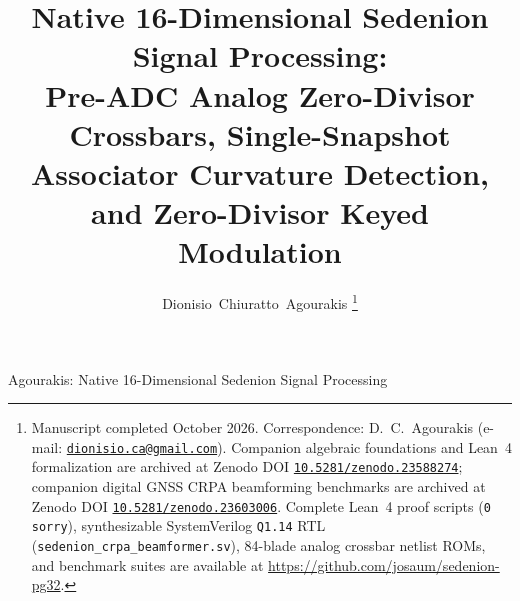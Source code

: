 \documentclass[journal,twoside]{IEEEtran}
\theoremstyle{definition}
\theoremstyle{remark}
\begin{document}
\title{Native 16-Dimensional Sedenion Signal Processing:\\
Pre-ADC Analog Zero-Divisor Crossbars, Single-Snapshot Associator Curvature Detection, and Zero-Divisor Keyed Modulation}

\author{Dionisio~Chiuratto~Agourakis%
\thanks{Manuscript completed October 2026. Correspondence: D.~C.~Agourakis (e-mail: \href{mailto:dionisio.ca@gmail.com}{\texttt{dionisio.ca@gmail.com}}). Companion algebraic foundations and Lean~4 formalization are archived at Zenodo DOI \href{https://doi.org/10.5281/zenodo.23588274}{\texttt{10.5281/zenodo.23588274}}; companion digital GNSS CRPA beamforming benchmarks are archived at Zenodo DOI \href{https://doi.org/10.5281/zenodo.23603006}{\texttt{10.5281/zenodo.23603006}}. Complete Lean~4 proof scripts (\texttt{0 sorry}), synthesizable SystemVerilog \texttt{Q1.14} RTL (\texttt{sedenion\_crpa\_beamformer.sv}), 84-blade analog crossbar netlist ROMs, and benchmark suites are available at \url{https://github.com/josaum/sedenion-pg32}.}}

%
{Agourakis: Native 16-Dimensional Sedenion Signal Processing}

\maketitle
\end{document}
